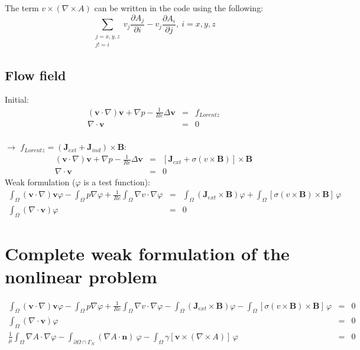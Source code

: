 \documentclass[smallextended]{svjour3}       %
\begin{document}
		The term $v \times \left( \nabla \times A \right)$ can be written in the code using the following:
		$$\sum_{\substack{j = x, y, z \\ j != i}} v_j \frac{\partial A_j}{\partial i} - v_j \frac{\partial A_i}{\partial j},\ i = x, y, z$$
		\subsection{Flow field}
		Initial:
		\begin{eqnarray}
			\left(\mathbf{v} \cdot \nabla\right)\mathbf{v} + \nabla p - \frac{1}{Re} \Delta \mathbf{v} & = & f_{Lorentz}\\
			\nabla \cdot \mathbf{v} & = & 0
		\end{eqnarray}\ \\
		$\rightarrow$ $f_{Lorentz} = \left(\mathbf{J}_{ext} + \mathbf{J}_{ind}\right) \times \mathbf{B}$:
		\ \\
		\begin{eqnarray}
			\left(\mathbf{v} \cdot \nabla\right)\mathbf{v} + \nabla p - \frac{1}{Re} \Delta \mathbf{v} & = & \left[\mathbf{J}_{ext} + \sigma \left(v \times \mathbf{B}\right)\right] \times \mathbf{B}\\
			\nabla \cdot \mathbf{v} & = & 0
		\end{eqnarray}
		Weak formulation  ($\varphi$ is a test function):
		\begin{eqnarray}
			\int_{\Omega} \left(\mathbf{v} \cdot \nabla\right)\mathbf{v} \varphi
			- \int_{\Omega} p \nabla \varphi
			+ \frac{1}{Re} \int_{\Omega} \nabla v \cdot \nabla \varphi
			& = &
			\int_{\Omega} \left(\mathbf{J}_{ext} \times \mathbf{B}\right) \varphi
			+ \int_{\Omega} \left[\sigma \left(v \times \mathbf{B}\right) \times \mathbf{B}\right]\, \varphi
			\\
			\int_{\Omega} \left(\nabla \cdot \mathbf{v}\right) \varphi & = & 0
		\end{eqnarray}
				
		\section{Complete weak formulation of the nonlinear problem}
		\begin{eqnarray}
			\int_{\Omega} \left(\mathbf{v} \cdot \nabla\right)\mathbf{v} \varphi
			- \int_{\Omega} p \nabla \varphi
			+ \frac{1}{Re} \int_{\Omega} \nabla v \cdot \nabla \varphi
			- \int_{\Omega} \left(\mathbf{J}_{ext} \times \mathbf{B}\right) \varphi
			- \int_{\Omega} \left[\sigma \left(v \times \mathbf{B}\right) \times \mathbf{B}\right]\, \varphi
			& = & 0
			\\
			\int_{\Omega} \left(\nabla \cdot \mathbf{v}\right) \varphi & = & 0\\
			\frac{1}{\mu}\int_{\Omega}\nabla A \cdot \nabla \varphi - \int_{\partial \Omega \cap \Gamma_{N}} \left(\nabla A\cdot \mathbf{n}\right)\ \varphi 
			 - \int_{\Omega} \gamma \left[\mathbf{v} \times \left( \nabla \times A \right)\right]\,\varphi & = & 0
		\end{eqnarray}
\end{document}
